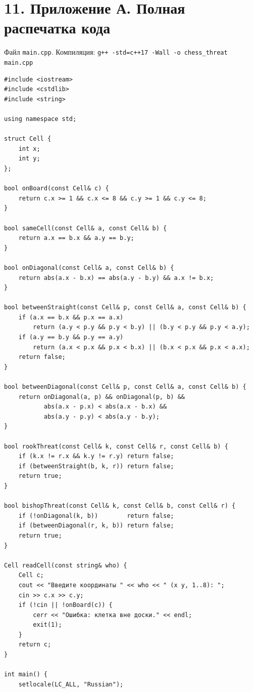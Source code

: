 \documentclass[12pt,a4paper]{article}
\begin{document}
\newpage
\section*{11. Приложение А. Полная распечатка кода}

Файл \texttt{main.cpp}. Компиляция:
\texttt{g++ -std=c++17 -Wall -o chess\_threat main.cpp}

\begin{Verbatim}[frame=single]
#include <iostream>
#include <cstdlib>
#include <string>

using namespace std;

struct Cell {
    int x;
    int y;
};

bool onBoard(const Cell& c) {
    return c.x >= 1 && c.x <= 8 && c.y >= 1 && c.y <= 8;
}

bool sameCell(const Cell& a, const Cell& b) {
    return a.x == b.x && a.y == b.y;
}

bool onDiagonal(const Cell& a, const Cell& b) {
    return abs(a.x - b.x) == abs(a.y - b.y) && a.x != b.x;
}

bool betweenStraight(const Cell& p, const Cell& a, const Cell& b) {
    if (a.x == b.x && p.x == a.x)
        return (a.y < p.y && p.y < b.y) || (b.y < p.y && p.y < a.y);
    if (a.y == b.y && p.y == a.y)
        return (a.x < p.x && p.x < b.x) || (b.x < p.x && p.x < a.x);
    return false;
}

bool betweenDiagonal(const Cell& p, const Cell& a, const Cell& b) {
    return onDiagonal(a, p) && onDiagonal(p, b) &&
           abs(a.x - p.x) < abs(a.x - b.x) &&
           abs(a.y - p.y) < abs(a.y - b.y);
}

bool rookThreat(const Cell& k, const Cell& r, const Cell& b) {
    if (k.x != r.x && k.y != r.y) return false;
    if (betweenStraight(b, k, r)) return false;
    return true;
}

bool bishopThreat(const Cell& k, const Cell& b, const Cell& r) {
    if (!onDiagonal(k, b))        return false;
    if (betweenDiagonal(r, k, b)) return false;
    return true;
}

Cell readCell(const string& who) {
    Cell c;
    cout << "Введите координаты " << who << " (x y, 1..8): ";
    cin >> c.x >> c.y;
    if (!cin || !onBoard(c)) {
        cerr << "Ошибка: клетка вне доски." << endl;
        exit(1);
    }
    return c;
}

int main() {
    setlocale(LC_ALL, "Russian");


\end{Verbatim}
\end{document}
